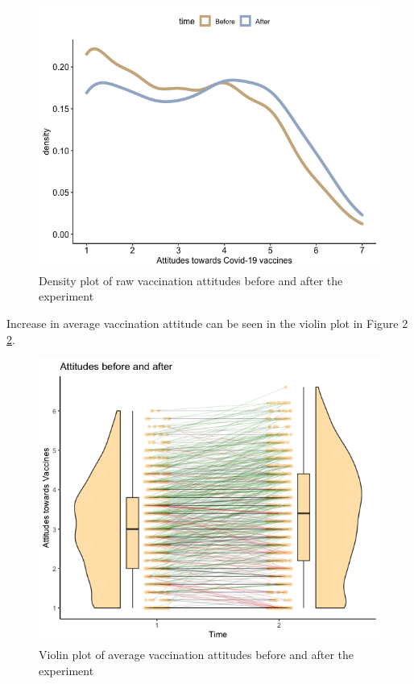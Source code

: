 \documentclass[
  english,
  ,jou,floatsintext]{apa6}
\begin{document}
\begin{figure}

{\centering \includegraphics[width=1\linewidth]{../plots/raw_density} 

}

\caption{Density plot of raw vaccination attitudes before and after the experiment}\label{fig:figure1}
\end{figure}

Increase in average vaccination attitude can be seen in the violin plot in Figure 2 \ref{fig:figure2}.

\begin{figure}

{\centering \includegraphics[width=1\linewidth]{../plots/before_and_after_violin} 

}

\caption{Violin plot of average vaccination attitudes before and after the experiment}\label{fig:figure2}
\end{figure}
\end{document}
